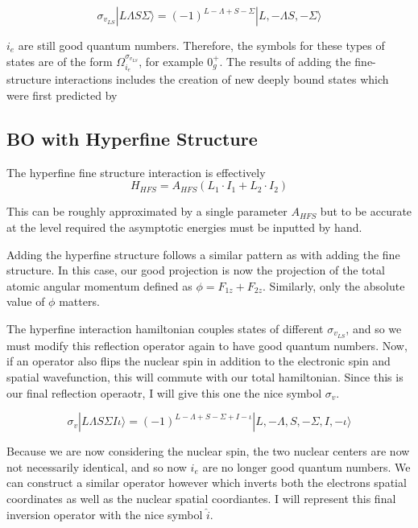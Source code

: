 \documentclass[prl, longbibliography]{revtex4-2}
\begin{document}
$$
\sigma_{v_{LS}}|L\Lambda S \Sigma\rangle = (-1)^{L-\Lambda+S-\Sigma}|L,-\Lambda S, -\Sigma\rangle
$$

$i_e$ are still good quantum numbers. Therefore, the symbols for these types of states are of the form $\Omega_{i_e}^{\sigma_{v_{LS}}}$, for example $0_g^+$. The results of adding the fine-structure interactions includes the creation of new deeply bound states which were first predicted by \cite{stwalley_pure_1978}

\subsection{BO with Hyperfine Structure}

The hyperfine fine structure interaction is effectively
$$
H_{HFS} = A_{HFS}(L_1\cdot I_1 + L_2 \cdot I_2)
$$

This can be roughly approximated by a single parameter $A_{HFS}$ but to be accurate at the level required the asymptotic energies must be inputted by hand.

Adding the hyperfine structure follows a similar pattern as with adding the fine structure. In this case, our good projection is now the projection of the total atomic angular momentum defined as $\phi=F_{1z}+F_{2z}$. Similarly, only the absolute value of $\phi$ matters. 

The hyperfine interaction hamiltonian couples states of different $\sigma_{v_{LS}}$, and so we must modify this reflection operator again to have good quantum numbers. Now, if an operator also flips the nuclear spin in addition to the electronic spin and spatial wavefunction, this will commute with our total hamiltonian. Since this is our final reflection operaotr, I will give this one the nice symbol $\sigma_v$. 

$$
\sigma_{v}|L\Lambda S \Sigma I \iota\rangle = (-1)^{L-\Lambda+S-\Sigma+I-\iota}|L,-\Lambda, S, -\Sigma, I, -\iota\rangle
$$

Because we are now considering the nuclear spin, the two nuclear centers are now not necessarily identical, and so now $i_e$ are no longer good quantum numbers. We can construct a similar operator however which inverts both the electrons spatial coordinates as well as the nuclear spatial coordiantes. I will represent this final inversion operator with the nice symbol $\hat{i}$. 
\end{document}
